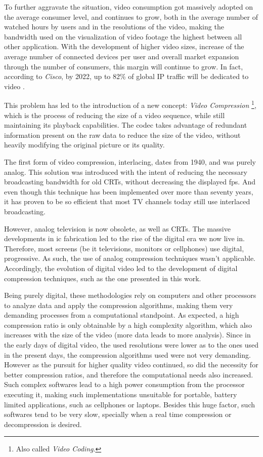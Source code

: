 To further aggravate the situation, video consumption got massively adopted on the average consumer level, and continues to grow, both in the average number of watched hours by users and in the resolutions of the video, making the bandwidth used on the visualization of video footage the highest between all other application. With the development of higher video sizes, increase of the average number of connected devices per user and overall market expansion through the number of consumers, this margin will continue to grow. In fact, according to \emph{Cisco}, by 2022, up to 82\% of global IP traffic will be dedicated to video \cite[Trends~1~\&~4]{CiscoVisualNetworking}.

This problem has led to the introduction of a new concept: \emph{Video Compression} \footnote{Also called \textit{Video Coding}.}, which is the process of reducing the size of a video sequence, while still maintaining its playback capabilities. The \Gls{codec} takes advantage of redundant information present on the raw data to reduce the size of the video, without heavily modifying the original picture or its quality. 

The first form of video compression, \gls{interlacing}, dates from 1940, and was purely analog. This solution was introduced with the intent of reducing the necessary broadcasting bandwidth for old CRTs, without decreasing the displayed fps. And even though this technique has been implemented over more than seventy years, it has proven to be so efficient that most TV channels today still use interlaced broadcasting.

However, analog television is now obsolete, as well as CRTs. The massive developments in \Gls{ic} fabrication led to the rise of the digital era we now live in. Therefore, most screens (be it televisions, monitors or cellphones) use digital, \gls{progressive}. As such, the use of analog compression techniques wasn't applicable. Accordingly, the evolution of digital video led to the development of digital compression techniques, such as the one presented in this work.

Being purely digital, these methodologies rely on computers and other processors to analyze data and apply the compression algorithms, making them very demanding processes from a computational standpoint. As expected, a high compression ratio is only obtainable by a high complexity algorithm, which also increases with the size of the video (more data leads to more analysis). Since in the early days of digital video, the used resolutions were lower as to the ones used in the present days, the compression algorithms used were not very demanding. However as the pursuit for higher quality video continued, so did the necessity for better compression ratios, and therefore the computational needs also increased. Such complex softwares lead to a high power consumption from the processor executing it, making such implementations unsuitable for portable, battery limited applications, such as cellphones or laptops. Besides this huge factor, such softwares tend to be very slow, specially when a real time compression or decompression is desired.

